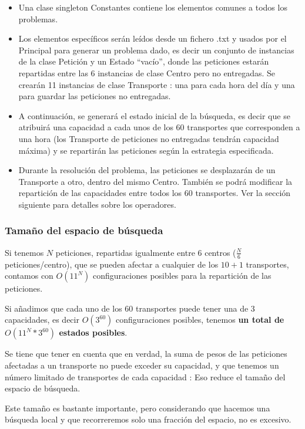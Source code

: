\documentclass{article}
\begin{document}
\begin{itemize}
\item Una clase singleton Constantes contiene los elementos comunes a todos los
problemas.
\item Los elementos específicos serán leídos desde un fichero .txt y usados por
el Principal para generar un problema dado, es decir un conjunto de instancias
de la clase Petición y un Estado ``vacío'', donde las peticiones estarán
repartidas entre las 6 instancias de clase Centro pero no entregadas. Se crearán
11 instancias de clase Transporte : una para cada hora del día y una para
guardar las peticiones no entregadas.
\item A continuación, se generará el estado inicial de la búsqueda, es decir que
se atribuirá una capacidad a cada unos de los 60 transportes que corresponden a
una hora (los Transporte de peticiones no entregadas tendrán capacidad máxima) y
se repartirán las peticiones según la estrategia especificada.
\item Durante la resolución del problema, las peticiones se desplazarán de un
Transporte a otro, dentro del mismo Centro. También se podrá modificar la
repartición de las capacidades entre todos los 60 transportes. Ver la sección
siguiente para detalles sobre los operadores.
\end{itemize}

\subsubsection{Tamaño del espacio de búsqueda}

Si tenemos $N$ peticiones, repartidas igualmente entre 6 centros ($\frac{N}{6}$
peticiones/centro), que se pueden afectar a cualquier de los $10+1$ transportes,
contamos con $O(11^N)$ configuraciones posibles para la repartición de las
peticiones.

Si añadimos que cada uno de los 60 transportes puede tener una de 3 capacidades,
es decir $O(3^{60})$ configuraciones posibles, tenemos \textbf{un total de
$O(11^N*3^{60})$ estados posibles}.

Se tiene que tener en cuenta que en verdad, la suma de pesos de las peticiones
afectadas a un transporte no puede exceder su capacidad, y que tenemos un número
limitado de transportes de cada capacidad : Eso reduce el tamaño del espacio de
búsqueda.

Este tamaño es bastante importante, pero considerando que hacemos una búsqueda
local y que recorreremos solo una fracción del espacio, no es excesivo.
\end{document}
